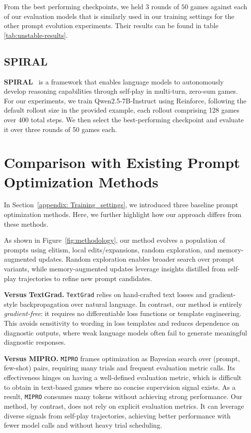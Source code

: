 From the best performing checkpoints, we held $3$ rounds of $50$ games against each of our evaluation models that is similarly used in our training settings for the other prompt evolution experiments. Their results can be found in table \ref{tab:unstable-results}.



\subsection{SPIRAL}
\label{app:baseline:spiral}
\textbf{SPIRAL}~\citep{liu2025spiral} is a framework that enables language models to autonomously develop reasoning capabilities through self-play in multi-turn, zero-sum games. For our experiments, we train Qwen2.5-7B-Instruct using Reinforce, following the default rollout size in the provided example, each rollout comprising 128 games over 400 total steps. We then select the best-performing checkpoint and evaluate it over three rounds of 50 games each.

\section{Comparison with Existing Prompt Optimization Methods} \label{app:section:prompt_optimization_comparison}

In Section~\ref{appendix: Training_settings}, we introduced three baseline prompt optimization methods. Here, we further highlight how our approach differs from these methods.  

As shown in Figure~\ref{fig:methodology}, our method evolves a population of prompts using elitism, local edits/expansions, random exploration, and memory-augmented updates. Random exploration enables broader search over prompt variants, while memory-augmented updates leverage insights distilled from self-play trajectories to refine new prompt candidates.  

\textbf{Versus TextGrad.} \texttt{TextGrad} relies on hand-crafted text losses and gradient-style backpropagation over natural language. In contrast, our method is entirely \emph{gradient-free}: it requires no differentiable loss functions or template engineering. This avoids sensitivity to wording in loss templates and reduces dependence on diagnostic outputs, where weak language models often fail to generate meaningful diagnostic responses.  

\textbf{Versus MIPRO.} \texttt{MIPRO} frames optimization as Bayesian search over (prompt, few-shot) pairs, requiring many trials and frequent evaluation metric calls. Its effectiveness hinges on having a well-defined evaluation metric, which is difficult to obtain in text-based games where no concise supervision signal exists. As a result, \texttt{MIPRO} consumes many tokens without achieving strong performance. Our method, by contrast, does not rely on explicit evaluation metrics. It can leverage diverse signals from self-play trajectories, achieving better performance with fewer model calls and without heavy trial scheduling. 

